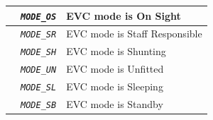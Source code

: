 \documentclass{template/openetcs}
\begin{document}
\begin{itemize}
\begin{longtable}{|l|l|l|}
			\hline

			&	\begin{minipage}[t]{0.40\linewidth} \emph{\texttt{MODE\_OS}} \end{minipage}
			&	\begin{minipage}[t]{0.38\linewidth} EVC mode is On Sight \end{minipage} \\ 

			\hline

			&	\begin{minipage}[t]{0.40\linewidth} \emph{\texttt{MODE\_SR}} \end{minipage}
			&	\begin{minipage}[t]{0.38\linewidth} EVC mode is Staff Responsible \end{minipage} \\ 

			\hline

			&	\begin{minipage}[t]{0.40\linewidth} \emph{\texttt{MODE\_SH}} \end{minipage}
			&	\begin{minipage}[t]{0.38\linewidth} EVC mode is Shunting \end{minipage} \\ 

			\hline

			&	\begin{minipage}[t]{0.40\linewidth} \emph{\texttt{MODE\_UN}} \end{minipage}
			&	\begin{minipage}[t]{0.38\linewidth} EVC mode is Unfitted \end{minipage} \\ 

			\hline

			&	\begin{minipage}[t]{0.40\linewidth} \emph{\texttt{MODE\_SL}} \end{minipage}
			&	\begin{minipage}[t]{0.38\linewidth} EVC mode is Sleeping \end{minipage} \\ 

			\hline

			&	\begin{minipage}[t]{0.40\linewidth} \emph{\texttt{MODE\_SB}} \end{minipage}
			&	\begin{minipage}[t]{0.38\linewidth} EVC mode is Standby \end{minipage} \\ 


\end{longtable}
\end{itemize}
\end{document}
